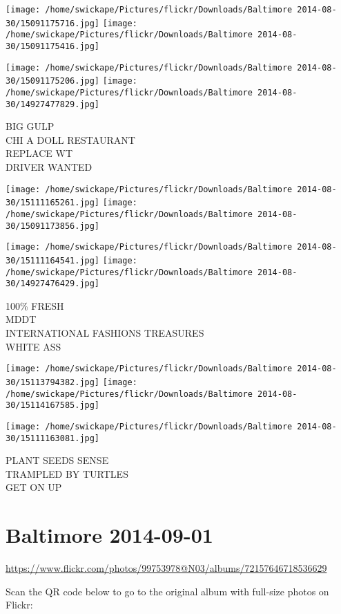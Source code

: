 \documentclass[10pt,letterpaper]{article}
\begin{document}
\texttt{[image: /home/swickape/Pictures/flickr/Downloads/Baltimore 2014-08-30/15091175716.jpg]}
\texttt{[image: /home/swickape/Pictures/flickr/Downloads/Baltimore 2014-08-30/15091175416.jpg]}

\texttt{[image: /home/swickape/Pictures/flickr/Downloads/Baltimore 2014-08-30/15091175206.jpg]}
\texttt{[image: /home/swickape/Pictures/flickr/Downloads/Baltimore 2014-08-30/14927477829.jpg]}

BIG GULP\\
CHI A DOLL RESTAURANT\\
REPLACE WT\\
DRIVER WANTED
\pagebreak

\texttt{[image: /home/swickape/Pictures/flickr/Downloads/Baltimore 2014-08-30/15111165261.jpg]}
\texttt{[image: /home/swickape/Pictures/flickr/Downloads/Baltimore 2014-08-30/15091173856.jpg]}

\texttt{[image: /home/swickape/Pictures/flickr/Downloads/Baltimore 2014-08-30/15111164541.jpg]}
\texttt{[image: /home/swickape/Pictures/flickr/Downloads/Baltimore 2014-08-30/14927476429.jpg]}

100\% FRESH\\
MDDT\\
INTERNATIONAL FASHIONS TREASURES\\
WHITE ASS
\pagebreak

\texttt{[image: /home/swickape/Pictures/flickr/Downloads/Baltimore 2014-08-30/15113794382.jpg]}
\texttt{[image: /home/swickape/Pictures/flickr/Downloads/Baltimore 2014-08-30/15114167585.jpg]}

\texttt{[image: /home/swickape/Pictures/flickr/Downloads/Baltimore 2014-08-30/15111163081.jpg]}

PLANT SEEDS SENSE\\
TRAMPLED BY TURTLES\\
GET ON UP
\pagebreak

\section*{Baltimore 2014-09-01}

\url{https://www.flickr.com/photos/99753978@N03/albums/72157646718536629}

Scan the QR code below to go to the original album with full-size photos on Flickr:
\end{document}
